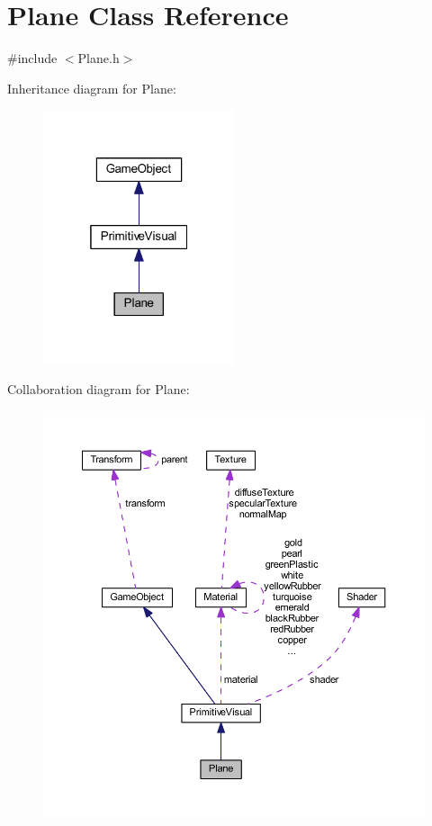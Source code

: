 \hypertarget{class_plane}{}\section{Plane Class Reference}
\label{class_plane}


{\ttfamily \#include $<$Plane.\+h$>$}



Inheritance diagram for Plane\+:\nopagebreak
\begin{figure}[H]
\begin{center}
\leavevmode
\includegraphics[width=160pt]{class_plane__inherit__graph}
\end{center}
\end{figure}


Collaboration diagram for Plane\+:\nopagebreak
\begin{figure}[H]
\begin{center}
\leavevmode
\includegraphics[width=350pt]{class_plane__coll__graph}
\end{center}
\end{figure}
